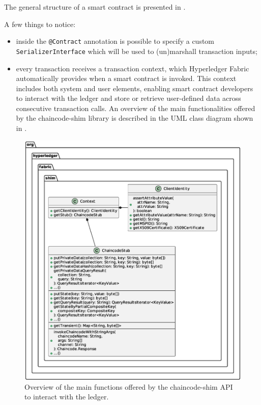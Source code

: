 \documentclass{scrartcl}
\begin{document}
The general structure of a smart contract is presented in .


A few things to notice:

\begin{itemize}
    \item inside the \texttt{@Contract} annotation is possible to specify a custom \texttt{SerializerInterface} which will be used to (un)marshall transaction inputs;
    \item every transaction receives a transaction context, which Hyperledger Fabric automatically provides when a smart contract is invoked. This context includes both system and user elements, enabling smart contract developers to interact with the ledger and store or retrieve user-defined data across consecutive transaction calls. An overview of the main functionalities offered by the chaincode-shim library is described in the UML class diagram shown in .
\end{itemize}

\begin{figure}
    \centering
    \includegraphics[width=\linewidth]{figures/chaincode-shim-api.eps}
    \caption{Overview of the main functions offered by the chaincode-shim API to interact with the ledger.}
    \label{fig:chaincode-api} 
\end{figure}
\end{document}
